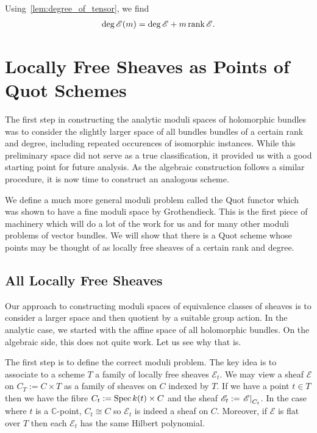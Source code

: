 \documentclass[12pt]{ociamthesis}  %
\begin{document}
\begin{example}
  Using~\ref{lem:degree_of_tensor}, we find 
  \begin{align*}
    \deg \mathscr E(m) = \deg\mathscr E + m\operatorname{rank}\mathscr E.
  \end{align*}
\end{example}

\missingsection

\section{Locally Free Sheaves as Points of Quot Schemes}

The first step in constructing the analytic moduli spaces of
holomorphic bundles was to consider the slightly larger space of
all bundles bundles of a certain rank and degree, including repeated
occurences of isomorphic instances. While this preliminary space
did not serve as a true
classification,
it provided us with a good starting point for future analysis. As the
algebraic construction follows a similar procedure, it is now
time to construct an analogous scheme.

We define a much more general moduli problem called
the Quot functor which was shown to have a fine moduli space by
Grothendieck. This is the first piece of machinery which will do a
lot of the work for us and for many other moduli problems of vector
bundles. We will show that there is a Quot scheme whose points
may be thought of as locally free sheaves of a certain rank and
degree.

\subsection{All Locally Free Sheaves}

Our approach to constructing moduli spaces of equivalence classes of
sheaves is to consider a larger space and then quotient by a suitable
group action. In the analytic case, we started with the affine space of
all holomorphic bundles. On the algebraic side, this does not quite work.
Let us see why that is.

The first step is to define the correct moduli problem. The key idea
is to associate to a scheme $T$ a family of locally free sheaves
$\mathscr E_t$. We may view a sheaf $\mathscr E$ on $C_T := C\times T$
as a family of sheaves on $C$ indexed by $T$. If we have a point $t\in T$
then we have the fibre $C_t := \operatorname{Spec} k(t) \times C$ and the sheaf
$\mathscr E_t := \left.{\mathscr E}\right\vert_{C_t}$. In the case where
$t$ is a $\mathbb{C}$-point, $C_t \cong C$ so $\mathscr E_t$ is indeed
a sheaf on $C$. Moreover, if $\mathscr E$ is flat over $T$ then
each $\mathscr E_t$ has the same Hilbert polynomial.
\end{document}
